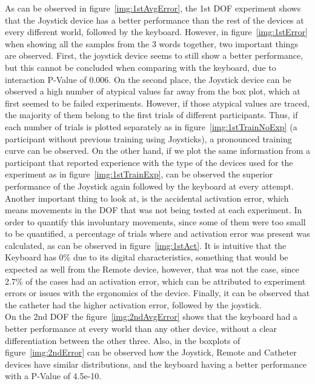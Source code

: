 As can be observed in figure~\ref{img:1stAvgError}, the 1st DOF experiment shows that the Joystick device has a better performance than the rest of the devices at every different world, followed by the keyboard. However, in figure~\ref{img:1stError} when showing all the samples from the 3 words together, two important things are observed. First, the joystick device seems to still show a better performance, but this cannot be concluded when comparing with the keyboard, due to interaction P-Value of 0.006. On the second place, the Joystick device can be observed a high number of atypical values far away from the box plot, which at first seemed to be failed experiments. However, if those atypical values are traced, the majority of them belong to the first trials of different participants. Thus, if each number of trials is plotted separately as in figure~\ref{img:1stTrainNoExp} (a participant without previous training using Joysticks), a pronounced training curve can be observed. On the other hand, if we plot the same information from a participant that reported experience with the type of the devices used for the experiment as in figure~\ref{img:1stTrainExp}, can be observed the superior performance of the Joystick again followed by the keyboard at every attempt.\\

Another important thing to look at, is the accidental activation error, which means movements in the DOF that was not being tested at each experiment. In order to quantify this involuntary movements, since some of them were too small to be quantified, a percentage of trials where and activation error was present was calculated, as can be observed in figure~\ref{img:1stAct}. It is intuitive that the Keyboard has 0\% due to its digital characteristics, something that would be expected as well from the Remote device, however, that was not the case, since 2.7\% of the cases had an activation error, which can be attributed to experiment errors or issues with the ergonomics of the device. Finally, it can be observed that the catheter had the higher activation error, followed by the joystick.\\

On the 2nd DOF the figure~\ref{img:2ndAvgError} shows that the keyboard had a better performance at every world than any other device, without a clear differentiation between the other three. Also, in the boxplots of figure~\ref{img:2ndError} can be observed how the Joystick, Remote and Catheter devices have similar distributions, and the keyboard having a better performance with a P-Value of 4.5e-10.\\


